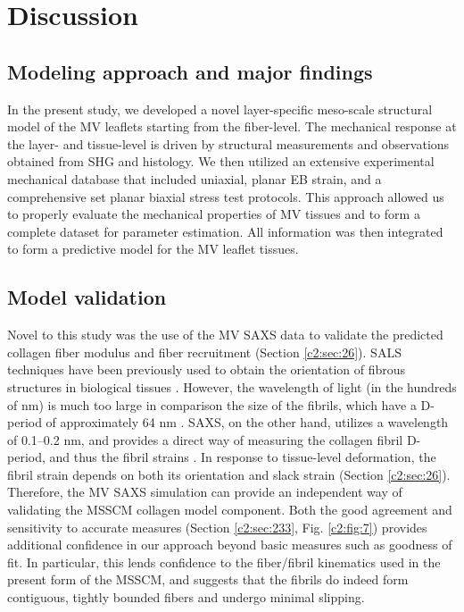 \section{Discussion}

\subsection{Modeling approach and major findings}

    In the present study, we developed a novel layer-specific meso-scale structural model of the MV leaflets starting from the fiber-level. The mechanical response at the layer- and tissue-level is driven by structural measurements and observations obtained from SHG and histology. We then utilized an extensive experimental mechanical database that included uniaxial, planar EB strain, and a comprehensive set planar biaxial stress test protocols. This approach allowed us to properly evaluate the mechanical properties of MV tissues and to form a complete dataset for parameter estimation. All information was then integrated to form a predictive model for the MV leaflet tissues.
    
    
\subsection{Model validation}

    Novel to this study was the use of the MV SAXS data \cite{liao_relation_2007} to validate the predicted collagen fiber modulus and fiber recruitment (Section \ref{c2:sec:26}). SALS techniques have been previously used to obtain the orientation of fibrous structures in biological tissues \cite{sacks_small_1997}. However, the wavelength of light (in the hundreds of nm) is much too large in comparison the size of the fibrils, which have a D-period of approximately 64 nm \cite{kastelic_structural_1980,hodge_recent_1963,chapman_electron_1984}. SAXS, on the other hand, utilizes a wavelength of 0.1–0.2 nm, and provides a direct way of measuring the collagen fibril D-period, and thus the fibril strains \cite{sasaki_elongation_1996,sasaki_stress_1996,liao_relation_2007}. In response to tissue-level deformation, the fibril strain depends on both its orientation and slack strain (Section \ref{c2:sec:26}). Therefore, the MV SAXS simulation can provide an independent way of validating the MSSCM collagen model component. Both the good agreement and sensitivity to accurate measures (Section \ref{c2:sec:233}, Fig. \ref{c2:fig:7}) provides additional confidence in our approach beyond basic measures such as goodness of fit. In particular, this lends confidence to the fiber/fibril kinematics used in the present form of the MSSCM, and suggests that the fibrils do indeed form contiguous, tightly bounded fibers and undergo minimal slipping.
    
